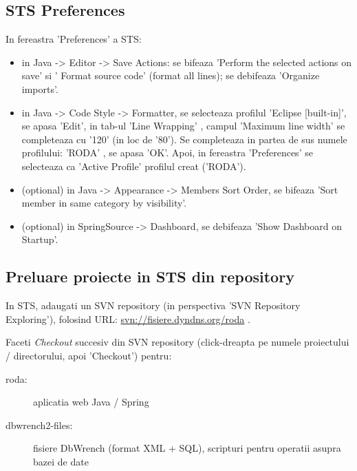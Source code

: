 \subsection{STS Preferences}
In fereastra 'Preferences' a STS:
\begin{itemize}
\item
in Java -> Editor -> Save Actions: se bifeaza 'Perform the selected actions on save' si ' Format source code' (format all lines); se debifeaza 'Organize imports'.
\item
in Java -> Code Style -> Formatter, se selecteaza profilul 'Eclipse [built-in]', se apasa 'Edit', in tab-ul 'Line Wrapping' , campul 'Maximum line width' se completeaza cu '120' (in loc de '80').
Se completeaza in partea de sus numele profilului: 'RODA' , se apasa 'OK'. Apoi, in fereastra 'Preferences' se selecteaza ca 'Active Profile' profilul creat ('RODA').
\item
(optional) in Java -> Appearance -> Members Sort Order, se bifeaza 'Sort member in same category by visibility'.
\item
(optional) in SpringSource -> Dashboard, se debifeaza 'Show Dashboard on Startup'.
\end{itemize}

\subsection{Preluare proiecte in STS din repository}


In STS, adaugati un SVN repository 
(in perspectiva 'SVN Repository Exploring'), 
folosind URL: \url{svn://fisiere.dyndns.org/roda} .

Faceti \emph{Checkout} succesiv din SVN repository 
(click-dreapta pe numele proiectului / directorului, apoi 'Checkout') 
pentru:
\begin{description}
\item [roda:] aplicatia web Java / Spring
\item [dbwrench2-files:] fisiere DbWrench (format XML + SQL), scripturi pentru operatii asupra bazei de date
\end{description}

\begin{comment}
\item [(optional) RODA-Model:] modelul Perl
\end{comment}

\begin{comment}
In STS, se face upgrade la Subversion 1.7 (pt. working copy) pentru fiecare din proiectele de mai sus: 
in perspectiva 'Spring', 
in view-ul 'Package Explorer' sau in view-ul 'Navigator', 
click-dreapta pe numele proiectului respectiv,
si apoi in meniul aparut:
'Team' -> 'Upgrade' -> 'OK'. 
Poate aparea un mesaj de eroare/warning, care indica
faptul ca working-copy local este deja conform versiunii 1.7 a SVN.
\end{comment}

